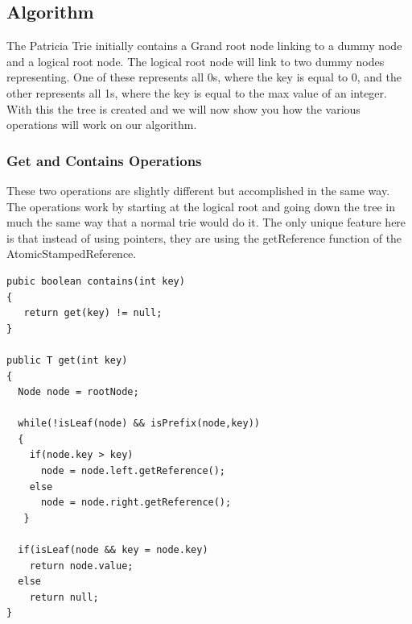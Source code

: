 \documentclass[conference]{IEEEtran}
\begin{document}
\subsection{Algorithm}
The Patricia Trie initially contains a Grand root node linking to a dummy node and a logical root node. The logical root node will link to two dummy nodes representing. One of these represents all 0s, where the key is equal to 0, and the other represents all 1s, where the key is equal to the max value of an integer. With this the tree is created and we will now show you how the various operations will work on our algorithm.

\subsubsection{Get and Contains Operations}
These two operations are slightly different but accomplished in the same way. The operations work by starting at the logical root and going down the tree in much the same way that a normal trie would do it. The only unique feature here is that instead of using pointers, they are using the getReference function of the AtomicStampedReference.
\begin{lstlisting}[frame=lines]
pubic boolean contains(int key)
{
   return get(key) != null;
}

public T get(int key)
{
  Node node = rootNode;

  while(!isLeaf(node) && isPrefix(node,key))
  {
    if(node.key > key)
      node = node.left.getReference();
    else
      node = node.right.getReference();
   }

  if(isLeaf(node && key = node.key)
    return node.value;
  else
    return null;
}
\end{lstlisting}
\end{document}
